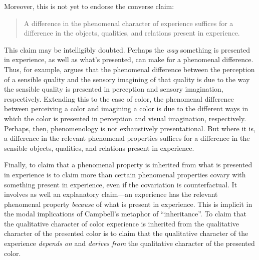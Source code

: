 \documentclass[12pt]{article}
\begin{document}
Moreover, this is not yet to endorse the converse claim:
\begin{quote}
    A difference in the phenomenal character of experience suffices for a difference in the objects, qualities, and relations present in experience. 
\end{quote}
This claim may be intelligibly doubted. Perhaps the \emph{way} something is presented in experience, as well as what's presented, can make for a phenomenal difference. Thus, for example, \citet{Martin:2002cr} argues that the phenomenal difference between the perception of a sensible quality and the sensory imagining of that quality is due to the way the sensible quality is presented in perception and sensory imagination, respectively. Extending this to the case of color, the phenomenal difference between perceiving a color and imagining a color is due to the different ways in which the color is presented in perception and visual imagination, respectively. Perhaps, then, phenomenology is not exhaustively presentational. But where it is, a difference in the relevant phenomenal properties suffices for a difference in the sensible objects, qualities, and relations present in experience.

Finally, to claim that a phenomenal property is inherited from what is presented in experience is to claim more than certain phenomenal properties covary with something present in experience, even if the covariation is counterfactual. It involves as well an explanatory claim---an experience has the relevant phenomenal property \emph{because} of what is present in experience. This is implicit in the modal implications of Campbell's metaphor of ``inheritance''. To claim that the qualitative character of color experience is inherited from the qualitative character of the presented color is to claim that the qualitative character of the experience \emph{depends on} and \emph{derives from} the qualitative character of the presented color. 
\end{document}
